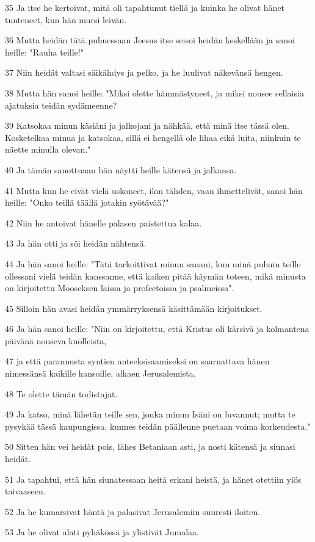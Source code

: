 \par 35 Ja itse he kertoivat, mitä oli tapahtunut tiellä ja kuinka he olivat hänet tunteneet, kun hän mursi leivän.
\par 36 Mutta heidän tätä puhuessaan Jeesus itse seisoi heidän keskellään ja sanoi heille: "Rauha teille!"
\par 37 Niin heidät valtasi säikähdys ja pelko, ja he luulivat näkevänsä hengen.
\par 38 Mutta hän sanoi heille: "Miksi olette hämmästyneet, ja miksi nousee sellaisia ajatuksia teidän sydämeenne?
\par 39 Katsokaa minun käsiäni ja jalkojani ja nähkää, että minä itse tässä olen. Kosketelkaa minua ja katsokaa, sillä ei hengellä ole lihaa eikä luita, niinkuin te näette minulla olevan."
\par 40 Ja tämän sanottuaan hän näytti heille kätensä ja jalkansa.
\par 41 Mutta kun he eivät vielä uskoneet, ilon tähden, vaan ihmettelivät, sanoi hän heille: "Onko teillä täällä jotakin syötävää?"
\par 42 Niin he antoivat hänelle palasen paistettua kalaa.
\par 43 Ja hän otti ja söi heidän nähtensä.
\par 44 Ja hän sanoi heille: "Tätä tarkoittivat minun sanani, kun minä puhuin teille ollessani vielä teidän kanssanne, että kaiken pitää käymän toteen, mikä minusta on kirjoitettu Mooseksen laissa ja profeetoissa ja psalmeissa".
\par 45 Silloin hän avasi heidän ymmärryksensä käsittämään kirjoitukset.
\par 46 Ja hän sanoi heille: "Niin on kirjoitettu, että Kristus oli kärsivä ja kolmantena päivänä nouseva kuolleista,
\par 47 ja että parannusta syntien anteeksisaamiseksi on saarnattava hänen nimessänsä kaikille kansoille, alkaen Jerusalemista.
\par 48 Te olette tämän todistajat.
\par 49 Ja katso, minä lähetän teille sen, jonka minun Isäni on luvannut; mutta te pysykää tässä kaupungissa, kunnes teidän päällenne puetaan voima korkeudesta."
\par 50 Sitten hän vei heidät pois, lähes Betaniaan asti, ja nosti kätensä ja siunasi heidät.
\par 51 Ja tapahtui, että hän siunatessaan heitä erkani heistä, ja hänet otettiin ylös taivaaseen.
\par 52 Ja he kumarsivat häntä ja palasivat Jerusalemiin suuresti iloiten.
\par 53 Ja he olivat alati pyhäkössä ja ylistivät Jumalaa.


